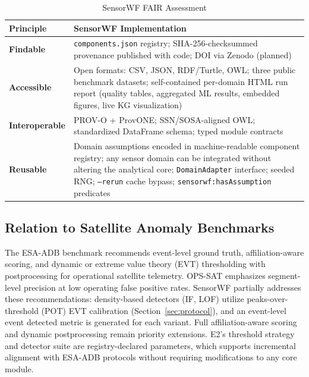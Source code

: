 \documentclass[conference]{IEEEtran}
\begin{document}
\begin{table}[t]
\caption{SensorWF FAIR Assessment}
\label{tab:fair}
\centering
\scriptsize
\setlength{\tabcolsep}{3pt}
\begin{tabular}{@{}lp{5.4cm}@{}}
\toprule
\textbf{Principle} & \textbf{SensorWF Implementation} \\
\midrule
\textbf{Findable}      & \texttt{components.json} registry; SHA-256-checksummed provenance published with code; DOI via Zenodo (planned) \\
\textbf{Accessible}    & Open formats: CSV, JSON, RDF/Turtle, OWL; three public benchmark datasets; self-contained per-domain HTML run report (quality tables, aggregated ML results, embedded figures, live KG visualization) \\
\textbf{Interoperable} & PROV-O + ProvONE; SSN/SOSA-aligned OWL; standardized DataFrame schema; typed module contracts \\
\textbf{Reusable}      & Domain assumptions encoded in machine-readable component registry; any sensor domain can be integrated without altering the analytical core; \texttt{DomainAdapter} interface; seeded RNG; \texttt{--rerun} cache bypass; \texttt{sensorwf:hasAssumption} predicates \\
\bottomrule
\end{tabular}
\end{table}

\subsection{Relation to Satellite Anomaly Benchmarks}

The ESA-ADB benchmark \cite{esa_adb2024} recommends event-level ground truth, affiliation-aware scoring, and dynamic or extreme value theory (EVT) thresholding with postprocessing for operational satellite telemetry. OPS-SAT \cite{ruszczak2025opssat} emphasizes segment-level precision at low operating false positive rates. SensorWF partially addresses these recommendations: density-based detectors (IF, LOF) utilize peaks-over-threshold (POT) EVT calibration (Section~\ref{sec:protocol}), and an event-level event detected metric is generated for each variant. Full affiliation-aware scoring and dynamic postprocessing remain priority extensions. E2's threshold strategy and detector suite are registry-declared parameters, which supports incremental alignment with ESA-ADB protocols without requiring modifications to any core module.


\end{document}
